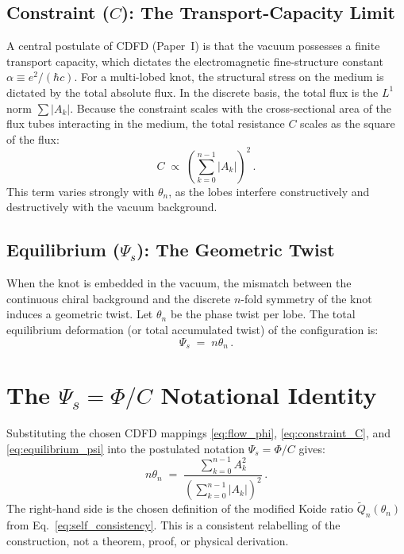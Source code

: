 \documentclass[11pt]{article}
\begin{document}
\subsection{Constraint ($C$): The Transport-Capacity Limit}
A central postulate of CDFD (Paper~I) is that the vacuum possesses a finite
transport capacity, which dictates the electromagnetic fine-structure constant
$\alpha \equiv e^2/(\hbar c)$.
For a multi-lobed knot, the structural stress on the medium is dictated by the
total absolute flux. In the discrete basis, the total flux is the $L^1$ norm
$\sum |A_k|$.
Because the constraint scales with the cross-sectional area of the flux tubes
interacting in the medium, the total resistance $C$ scales as the square of the flux:
\begin{equation}
  C \;\propto\; \left(\sum_{k=0}^{n-1} |A_k|\right)^2\,.
  \label{eq:constraint_C}
\end{equation}
This term varies strongly with $\theta_n$, as the lobes interfere constructively
and destructively with the vacuum background.

\subsection{Equilibrium ($\Psi_s$): The Geometric Twist}
When the knot is embedded in the vacuum, the mismatch between the continuous
chiral background and the discrete $n$-fold symmetry of the knot induces a
geometric twist.
Let $\theta_n$ be the phase twist per lobe. The total equilibrium deformation
(or total accumulated twist) of the configuration is:
\begin{equation}
  \Psi_s \;=\; n\theta_n\,.
  \label{eq:equilibrium_psi}
\end{equation}


\section{The $\Psi_s=\Phi/C$ Notational Identity}

Substituting the chosen CDFD mappings \eqref{eq:flow_phi},
\eqref{eq:constraint_C}, and \eqref{eq:equilibrium_psi} into the postulated
notation $\Psi_s = \Phi / C$ gives:
  \begin{equation}
    n\theta_n \;=\; \frac{\sum_{k=0}^{n-1} A_k^2}{\left(\sum_{k=0}^{n-1} |A_k|\right)^2}\,.
  \end{equation}
The right-hand side is the chosen definition of the modified Koide ratio
$\widetilde{Q}_n(\theta_n)$ from Eq.~\eqref{eq:self_consistency}. This is a
consistent relabelling of the construction, not a theorem, proof, or physical
derivation.
\end{document}
